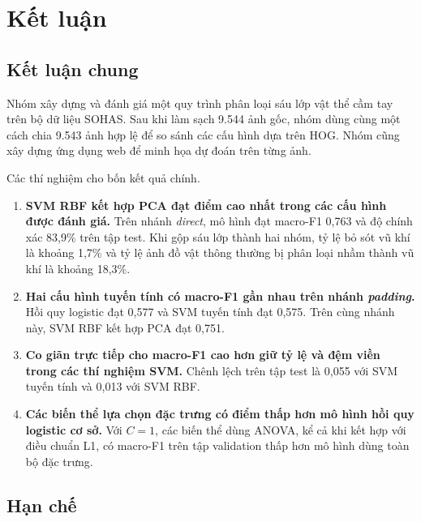 \section{Kết luận}
\label{sec:ket_luan}

\subsection{Kết luận chung}

Nhóm xây dựng và đánh giá một quy trình phân loại sáu lớp vật thể cầm tay trên bộ dữ liệu SOHAS. Sau khi làm sạch 9.544 ảnh gốc, nhóm dùng cùng một cách chia 9.543 ảnh hợp lệ để so sánh các cấu hình dựa trên HOG. Nhóm cũng xây dựng ứng dụng web để minh họa dự đoán trên từng ảnh.

Các thí nghiệm cho bốn kết quả chính.

\begin{enumerate}
  \item \textbf{SVM RBF kết hợp PCA đạt điểm cao nhất trong các cấu hình được đánh giá.} Trên nhánh \emph{direct}, mô hình đạt macro-F1 0,763 và độ chính xác 83,9\% trên tập test. Khi gộp sáu lớp thành hai nhóm, tỷ lệ bỏ sót vũ khí là khoảng 1,7\% và tỷ lệ ảnh đồ vật thông thường bị phân loại nhầm thành vũ khí là khoảng 18,3\%.
  \item \textbf{Hai cấu hình tuyến tính có macro-F1 gần nhau trên nhánh \emph{padding}.} Hồi quy logistic đạt 0,577 và SVM tuyến tính đạt 0,575. Trên cùng nhánh này, SVM RBF kết hợp PCA đạt 0,751.
  \item \textbf{Co giãn trực tiếp cho macro-F1 cao hơn giữ tỷ lệ và đệm viền trong các thí nghiệm SVM.} Chênh lệch trên tập test là 0,055 với SVM tuyến tính và 0,013 với SVM RBF.
  \item \textbf{Các biến thể lựa chọn đặc trưng có điểm thấp hơn mô hình hồi quy logistic cơ sở.} Với $C = 1$, các biến thể dùng ANOVA, kể cả khi kết hợp với điều chuẩn L1, có macro-F1 trên tập validation thấp hơn mô hình dùng toàn bộ đặc trưng.
\end{enumerate}

\subsection{Hạn chế}

